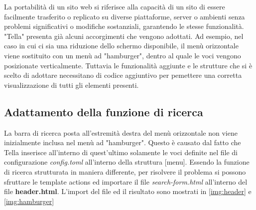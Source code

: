 \documentclass[target=bach,aauheader=]{thud}
\begin{document}
\newline
La portabilità di un sito web si riferisce alla capacità di un sito di essere facilmente trasferito o replicato su diverse piattaforme, server o ambienti senza problemi significativi o modifiche sostanziali, garantendo le stesse funzionalità. \cite{chiuchi2011efficiency}
\newline
"Tella" presenta già alcuni accorgimenti che vengono adottati. Ad esempio, nel caso in cui ci sia una riduzione dello schermo disponibile, 
il menù orizzontale viene sostituito con un menù ad "hamburger", dentro al quale le voci vengono posizionate verticalmente.
\newline
Tuttavia le funzionalità aggiunte e le strutture che si è scelto di adottare necessitano di codice aggiuntivo per pemettere una corretta visualizzazione di tutti gli elementi presenti.
\subsection{Adattamento della funzione di ricerca}
La barra di ricerca posta all'estremità destra del menù orizzontale non viene inizialmente inclusa nel menù ad "hamburger". 
Questo è causato dal fatto che Tella inserisce all'interno di quest'ultimo solamente le voci definite nel file di configurazione \textit{config.toml} all'interno della struttura [menu].
\newline
Essendo la funzione di ricerca strutturata in maniera differente, per risolvere il problema si possono sfruttare le template actions ed importare il file \textit{search-form.html} all'interno del file \textbf{header.html}. 
L'import del file ed il risultato sono mostrati in \cref{img:header} e \cref{img:hamburger}

\end{document}
